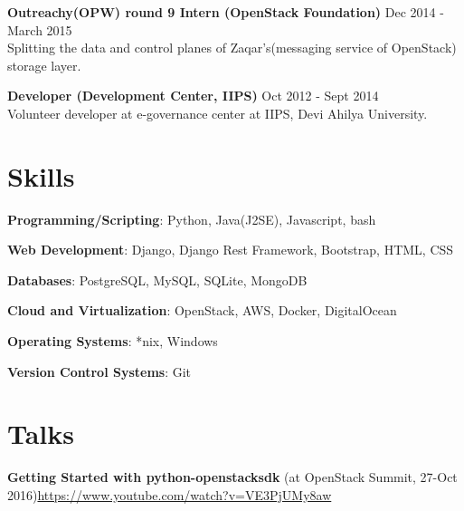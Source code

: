 \documentclass[margin,line]{resume}
\begin{document}
\begin{resume}
\begin{list2}
	\item \textbf{Outreachy(OPW) round 9 Intern (OpenStack Foundation)} \hspace{18mm} Dec 2014 - March 2015 \\ Splitting the data and control planes of Zaqar's(messaging service of OpenStack) storage layer.

	\item \textbf{Developer (Development Center, IIPS)} \hspace{52mm} Oct 2012 - Sept 2014 \\ Volunteer developer at e-governance center at IIPS, Devi Ahilya University.

	\end{list2}

    \section{\mysidestyle Skills} 

    \begin{list2}
	\item \textbf{Programming/Scripting}: \hspace{3mm} Python, Java(J2SE), Javascript, bash
	\item \textbf{Web Development}: \hspace{13mm}  Django, Django Rest Framework, Bootstrap, HTML, CSS
	\item \textbf{Databases}: \hspace{28mm} PostgreSQL, MySQL, SQLite,	MongoDB
	\item \textbf{Cloud and Virtualization}: \hspace{1mm} OpenStack, AWS, Docker,  DigitalOcean
	\item \textbf{Operating Systems}: \hspace{12mm} *nix, Windows
    \item \textbf{Version Control Systems}: \hspace{2mm} Git
	\end{list2}

    \section{\mysidestyle Talks}
    \begin{list2}
    \item \textbf{Getting Started with python-openstacksdk } (at OpenStack Summit, 27-Oct 2016)\url{https://www.youtube.com/watch?v=VE3PjUMy8aw}
    \end{list2}


\end{resume}
\end{document}
